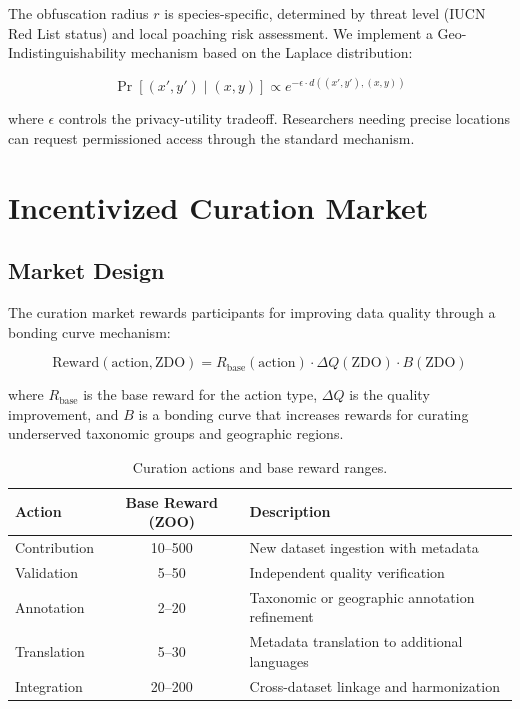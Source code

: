 \documentclass[11pt,a4paper]{article}
\begin{document}
The obfuscation radius $r$ is species-specific, determined by threat level (IUCN Red List status) and local poaching risk assessment.
We implement a Geo-Indistinguishability mechanism based on the Laplace distribution:

\begin{equation}
    \Pr[(x', y') \mid (x, y)] \propto e^{-\epsilon \cdot d((x', y'), (x, y))}
\end{equation}

\noindent where $\epsilon$ controls the privacy-utility tradeoff.
Researchers needing precise locations can request permissioned access through the standard mechanism.

\section{Incentivized Curation Market}
\label{sec:curation}

\subsection{Market Design}

The curation market rewards participants for improving data quality through a bonding curve mechanism:

\begin{equation}
    \text{Reward}(\text{action}, \text{ZDO}) = R_{\text{base}}(\text{action}) \cdot \Delta Q(\text{ZDO}) \cdot B(\text{ZDO})
\end{equation}

\noindent where $R_{\text{base}}$ is the base reward for the action type, $\Delta Q$ is the quality improvement, and $B$ is a bonding curve that increases rewards for curating underserved taxonomic groups and geographic regions.

\begin{table}[H]
\centering
\caption{Curation actions and base reward ranges.}
\label{tab:curation_rewards}
\begin{tabularx}{\textwidth}{@{}lcX@{}}
\toprule
\textbf{Action} & \textbf{Base Reward (ZOO)} & \textbf{Description} \\
\midrule
Contribution & 10--500 & New dataset ingestion with metadata \\
Validation & 5--50 & Independent quality verification \\
Annotation & 2--20 & Taxonomic or geographic annotation refinement \\
Translation & 5--30 & Metadata translation to additional languages \\
Integration & 20--200 & Cross-dataset linkage and harmonization \\
\bottomrule
\end{tabularx}
\end{table}
\end{document}
